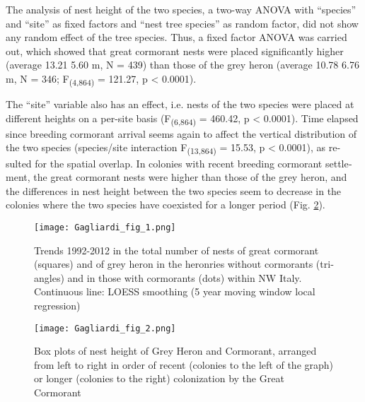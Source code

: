 \begin{otherlanguage}{english}
The analysis of nest height of the two species, a two-way ANOVA with
{\textquotedblleft}species{\textquotedblright} and
{\textquotedblleft}site{\textquotedblright} as fixed factors and
{\textquotedblleft}nest tree species{\textquotedblright} as random
factor, did not show any random effect of the tree species. Thus, a
fixed factor ANOVA was carried out, which showed that great cormorant
nests were placed significantly higher (average 13.21 {\textpm} 5.60 m,
N = 439) than those of the grey heron (average 10.78 {\textpm} 6.76 m,
N = 346; F\textsubscript{(4,864) }= 121.27, p {\textless} 0.0001).

The {\textquotedblleft}site{\textquotedblright} variable also has an
effect, i.e. nests of the two species were placed at different heights
on a per-site basis (F\textsubscript{(6,864) }= 460.42, p {\textless}
0.0001). Time elapsed since breeding cormorant arrival seems again to
affect the vertical distribution of the two species (species/site
interaction F\textsubscript{(13,864) }= 15.53, p {\textless} 0.0001),
as resulted for the spatial overlap. In colonies with recent breeding
cormorant settlement, the great cormorant nests were higher than those
of the grey heron, and the differences in nest height between the two
species seem to decrease in the colonies where the two species have
coexisted for a longer period (Fig. \ref{Gagliardi_fig_2}).

\begin{figure}[!h]
\centering
\texttt{[image: Gagliardi\_fig\_1.png]}
\caption{Trends 1992-2012 in the total number of nests of great cormorant (squares) and of grey heron in the heronries without cormorants (triangles) and in those with cormorants (dots) within NW Italy. Continuous line: LOESS smoothing (5 year moving window local regression)}
\label{Gagliardi_fig_1}
\end{figure}

\begin{figure}[!h]
\centering
\texttt{[image: Gagliardi\_fig\_2.png]}
\caption{Box plots of nest height of Grey Heron and Cormorant, arranged from left to right in order of recent (colonies to the left of the graph) or longer (colonies to the right) colonization by the Great Cormorant}
\label{Gagliardi_fig_2}
\end{figure}


\end{otherlanguage}

